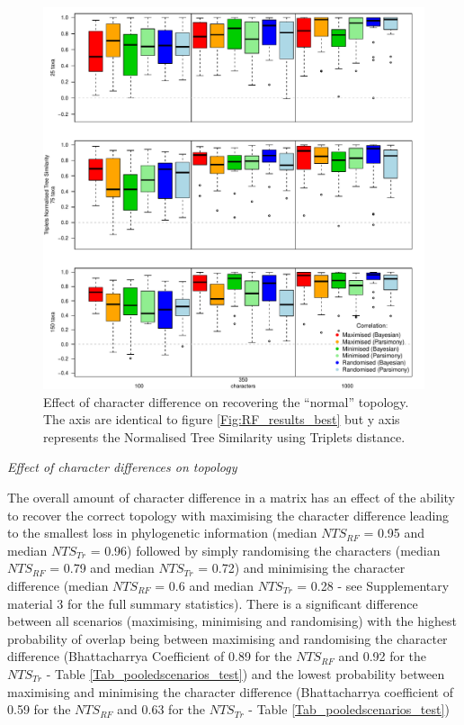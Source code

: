\documentclass[12pt,letterpaper]{article}
\renewcommand{\subsection}[1]{%
\bigskip
\begin{center}
\begin{large}
\normalfont\itshape #1
\end{large}
\end{center}}
\begin{document}
\begin{figure}[!htbp]
\centering
   \includegraphics[width=1\textwidth]{Figures/Tr_results_best.pdf} %
\caption{Effect of character difference on recovering the ``normal'' topology. The axis are identical to figure \ref{Fig:RF_results_best} but y axis represents the Normalised Tree Similarity using Triplets distance.}
\label{Fig:Tr_results_best}
\end{figure}

\subsection{Effect of character differences on topology}

The overall amount of character difference in a matrix has an effect of the ability to recover the correct topology with maximising the character difference leading to the smallest loss in phylogenetic information (median $NTS_{RF}$ = 0.95 and median $NTS_{Tr}$ = 0.96) followed by simply randomising the characters (median $NTS_{RF}$ = 0.79 and median $NTS_{Tr}$ = 0.72) and minimising the character difference (median $NTS_{RF}$ = 0.6 and median $NTS_{Tr}$ = 0.28 - see Supplementary material 3 for the full summary statistics).
There is a significant difference between all scenarios (maximising, minimising and randomising) with the highest probability of overlap being between maximising and randomising the character difference (Bhattacharrya Coefficient of 0.89 for the $NTS_{RF}$ and 0.92 for the $NTS_{Tr}$ - Table \ref{Tab_pooledscenarios_test}) and the lowest probability between maximising and minimising the character difference (Bhattacharrya coefficient of 0.59 for the $NTS_{RF}$ and 0.63 for the $NTS_{Tr}$ - Table \ref{Tab_pooledscenarios_test})
\end{document}
